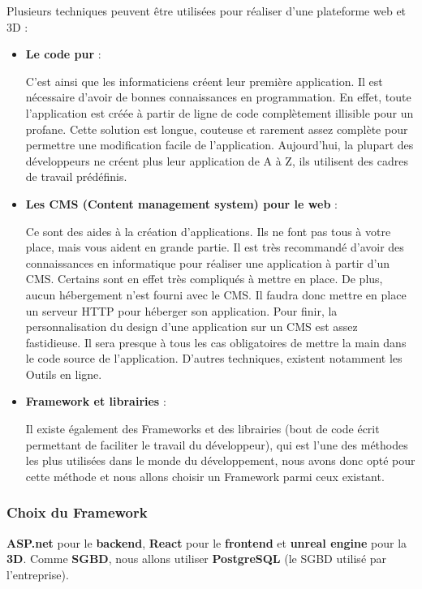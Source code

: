 Plusieurs techniques peuvent être utilisées pour réaliser d’une plateforme web et 3D :

\begin{itemize}
	\item \textbf{Le code pur} :

	      C’est ainsi que les informaticiens créent leur première application. 
		  Il est nécessaire d’avoir de bonnes connaissances en programmation. 
		  En effet, toute l'application est créée à partir de ligne de code complètement illisible pour un profane. 
		  Cette solution est longue, couteuse et rarement assez complète pour permettre une modification facile de l’application. 
		  Aujourd’hui, la plupart des développeurs ne créent plus leur application de A à Z, ils utilisent des cadres de travail prédéfinis.

	\item \textbf{Les CMS (Content management system) pour le web} :

	      Ce sont des aides à la création d’applications. 
		  Ils ne font pas tous à votre place, mais vous aident en grande partie. 
		  Il est très recommandé d’avoir des connaissances en informatique pour réaliser une application à partir d’un CMS. 
		  Certains sont en effet très compliqués à mettre en place. 
		  De plus, aucun hébergement n’est fourni avec le CMS. 
		  Il faudra donc mettre en place un serveur HTTP pour héberger son application. 
		  Pour finir, la personnalisation du design d’une application sur un CMS est assez fastidieuse. 
		  Il sera presque à tous les cas obligatoires de mettre la main dans le code source de   l’application. 
		  D’autres techniques, existent notamment les Outils en ligne.

	\item \textbf{Framework et librairies} :

	      Il existe également des Frameworks et des librairies (bout de code écrit permettant de faciliter le travail du développeur), qui est l’une des méthodes les plus utilisées dans le monde du développement, nous avons donc opté pour cette méthode et nous allons choisir un Framework parmi ceux existant.
\end{itemize}

\subsubsection{Choix du Framework}

\textbf{ASP.net} pour le \textbf{backend}, \textbf{React} pour le \textbf{frontend} et \textbf{unreal engine} pour la \textbf{3D}. Comme \textbf{SGBD}, nous allons utiliser \textbf{PostgreSQL} (le SGBD utilisé par l’entreprise).


